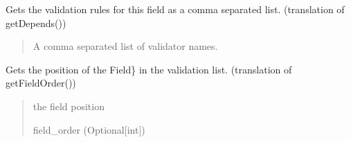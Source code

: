\documentclass[letterpaper,10pt,english]{sphinxmanual}
\begin{document}
\begin{fulllineitems}
\begin{fulllineitems}
\label{\detokenize{apache_commons_validator_python:apache_commons_validator_python.field_new.Field.depends}}
\pysigstartsignatures
{}
\pysigstopsignatures
\sphinxAtStartPar
Gets the validation rules for this field as a comma separated list.
(translation of getDepends())
\begin{quote}\begin{description}
\sphinxAtStartPar
A comma separated list of validator names.

\end{description}\end{quote}

\end{fulllineitems}


\begin{fulllineitems}
\label{\detokenize{apache_commons_validator_python:apache_commons_validator_python.field_new.Field.field_order}}
\pysigstartsignatures
{}
\pysigstopsignatures
\sphinxAtStartPar
Gets the position of the  Field\} in the validation list. (translation
of getFieldOrder())
\begin{quote}\begin{description}
\sphinxAtStartPar
the field position

\sphinxAtStartPar
field\_order (Optional{[}int{]})

\end{description}\end{quote}

\end{fulllineitems}



\end{fulllineitems}
\end{document}
